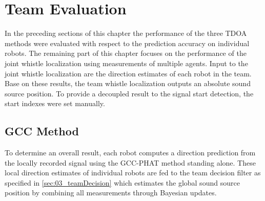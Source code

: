 \newpage
{}
\section{Team Evaluation}
\label{sec:04_teamEvaluation}


In the preceding sections of this chapter the performance of the three
\ac{TDOA} methods were evaluated with respect to the prediction accuracy on
individual robots.
The remaining part of this chapter focuses on the performance of the joint
whistle localization using measurements of multiple agents. 
Input to the joint whistle localization are the direction estimates of each
robot in the team. Base on these results, the team whistle localization outputs
an absolute sound source position. To provide a decoupled result to the signal
start detection, the start indexes were set manually. 



\subsection{GCC Method}
\label{04_teamGcc}

To determine an overall result, each robot computes a direction prediction from
the locally recorded signal using the \ac{GCC-PHAT} method standing
alone.
These local direction estimates of individual robots are fed to the team
decision filter as specified in \cref{sec:03_teamDecision} which estimates the
global sound source position by combining all measurements through Bayesian
updates.

